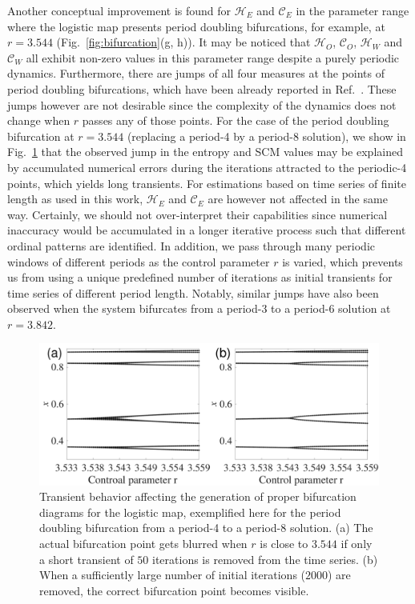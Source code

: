 \documentclass[aip,cha,reprint,nofootinbib]{revtex4-1}
\begin{document}
Another conceptual improvement is found for $\mathcal{H}_E$ and $\mathcal{C}_E$ in the parameter range where the logistic map presents period doubling bifurcations, for example, at $r = 3.544$ (Fig.~\ref{fig:bifurcation}(g, h)). It may be noticed that $\mathcal{H}_O$, $\mathcal{C}_O$, $\mathcal{H}_W$ and $\mathcal{C}_W$ all exhibit non-zero values in this parameter range despite a purely periodic dynamics. Furthermore, there are jumps of all four measures at the points of period doubling bifurcations, which have been already reported in Ref.~\cite{BandtPRL2002}. These jumps however are not desirable since the complexity of the dynamics does not change when $r$ passes any of those points. For the case of the period doubling bifurcation at $r=3.544$ (replacing a period-4 by a period-8 solution), we show in Fig.~\ref{fig:transient} that the observed jump in the entropy and SCM values may be explained by accumulated numerical errors during the iterations attracted to the periodic-4 points, which yields long transients. For estimations based on time series of finite length as used in this work, $\mathcal{H}_E$ and $\mathcal{C}_E$ are however not affected in the same way. Certainly, we should not over-interpret their capabilities since numerical inaccuracy would be accumulated in a longer iterative process such that different ordinal patterns are identified. In addition, we pass through many periodic windows of different periods as the control parameter $r$ is varied, which prevents us from using a unique predefined number of iterations as initial transients for time series of different period length. Notably, similar jumps have also been observed when the system bifurcates from a period-3 to a period-6 solution at $r = 3.842$. 

\begin{figure}
	\centering
	\includegraphics[width=\columnwidth]{period4_exampleTransients.pdf}
\caption{\small{Transient behavior affecting the generation of proper bifurcation diagrams for the logistic map, exemplified here for the period doubling bifurcation from a period-4 to a period-8 solution. (a) The actual bifurcation point gets blurred when $r$ is close to $3.544$ if only a short transient of $50$ iterations is removed from the time series. (b) When a sufficiently large number of initial iterations ($2000$) are removed, the correct bifurcation point becomes visible. }\label{fig:transient}}
\end{figure}
\end{document}

